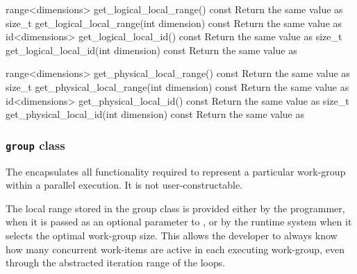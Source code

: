   \addRow
    {range<dimensions> get_logical_local_range() const}
    {
      Return the same value as 
    }
  \addRow
    {size_t get_logical_local_range(int dimension) const}
    {
      Return the same value as 
    }
  \addRow
    {id<dimensions> get_logical_local_id() const}
    {
      Return the same value as 
    }
  \addRow
    {size_t get_logical_local_id(int dimension) const}
    {
      Return the same value as 
    }

  \addRow
    {range<dimensions> get_physical_local_range() const}
    {
      Return the same value as 
    }
  \addRow
    {size_t get_physical_local_range(int dimension) const}
    {
      Return the same value as 
    }
  \addRow
    {id<dimensions> get_physical_local_id() const}
    {
      Return the same value as 
    }
  \addRow
    {size_t get_physical_local_id(int dimension) const}
    {
      Return the same value as 
    }

 \completeTable

\subsubsection{\texttt{group} class}
\label{group-class}

The  encapsulates all functionality
required to represent a particular \gls{work-group} within a
parallel execution. It is not user-constructable.

The local range stored in the group class is provided either by
the programmer, when it is passed as an optional parameter to
, or by the runtime system when it
selects the optimal work-group size. This allows the developer to
always know how many concurrent work-items are active in each
executing work-group, even through the abstracted iteration range of the
 loops.

